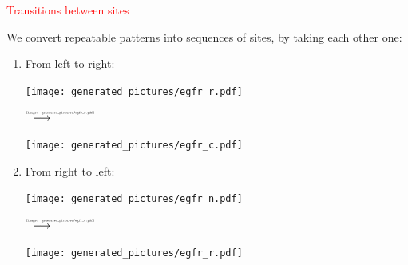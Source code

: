 \documentclass[landscape,20pt]{transparents2e}
\newcommand{\red}{\textcolor{red}}
\renewcommand{\frametitle}[1]{\red{\HUGE #1 }}
\begin{document}
\begin{slide}{\frametitle{Transitions between sites}}

\vfill

We convert repeatable patterns into sequences of sites, by taking each other one: \bigskip\\


\begin{minipage}{\linewidth}
\begin{center}
\end{center}
\end{minipage}

\vfill

\begin{enumerate}
  \item From left to right:

\hspace*{5cm}\texttt{[image: generated\_pictures/egfr\_r.pdf]}
\begin{minipage}{1cm}\vspace*{-2cm}$\stackrel{\begin{minipage}{1cm}\scalebox{0.3}{\texttt{[image: generated\_pictures/egfr\_r.pdf]}}\end{minipage}}{\longrightarrow}$\end{minipage} \texttt{[image: generated\_pictures/egfr\_c.pdf]}

\vfill

  \item From right to left:

  \hspace*{5cm}\texttt{[image: generated\_pictures/egfr\_n.pdf]}
  \begin{minipage}{1cm}\vspace*{-2cm}$\stackrel{\begin{minipage}{1cm}\scalebox{0.3}{\texttt{[image: generated\_pictures/egfr\_c.pdf]}}\end{minipage}}{\longrightarrow}$\end{minipage} \texttt{[image: generated\_pictures/egfr\_r.pdf]}

\end{enumerate}
\end{slide}
\end{document}
